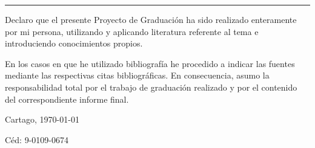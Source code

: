 \thispagestyle{empty}

\rule{10mm}{0pt}

\vfill

Declaro que el presente Proyecto de Graduación ha sido realizado enteramente
por mi persona, utilizando y aplicando literatura referente al tema e
introduciendo conocimientos propios.

En los casos en que he utilizado bibliografía he procedido a indicar las
fuentes mediante las respectivas citas bibliográficas.  En consecuencia,
asumo la responsabilidad total por el trabajo de graduación realizado y por
el contenido del correspondiente informe final.



\vspace*{8mm}

\begin{flushright}
  \scriptAuthor\par
  Cartago, \today \par
  Céd: 9-0109-0674
\end{flushright}




